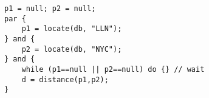 \begin{lstlisting}
p1 = null; p2 = null;
par {
    p1 = locate(db, "LLN");
} and {
    p2 = locate(db, "NYC");
} and {
    while (p1==null || p2==null) do {} // wait
    d = distance(p1,p2);
}
\end{lstlisting}
